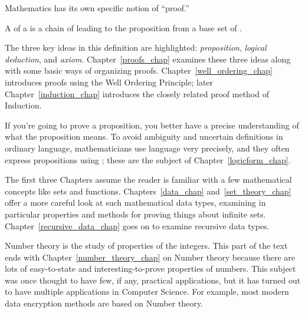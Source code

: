 Mathematics has its own specific notion of ``proof.''

\begin{definition*}
A  of a  is a chain of  leading to the proposition from a base set of .
\end{definition*}

The three key ideas in this definition are highlighted:
\emph{proposition}, \emph{logical deduction}, and \emph{axiom}.
Chapter~\ref{proofs_chap} examines these three ideas along with some
basic ways of organizing proofs.  Chapter~\ref{well_ordering_chap}
introduces proofs using the Well Ordering Principle; later
Chapter~\ref{induction_chap} introduces the closely related proof
method of Induction.

If you're going to prove a proposition, you better have a precise
understanding of what the proposition means.  To avoid ambiguity and
uncertain definitions in ordinary language, mathematicians use
language very precisely, and they often express propositions using
; these are the subject of
Chapter~\ref{logicform_chap}.

The first three Chapters assume the reader is familiar with a few
mathematical concepts like sets and functions.
Chapters~\ref{data_chap} and~\ref{set_theory_chap} offer a more
careful look at such mathematical data types, examining in particular
properties and methods for proving things about infinite sets.
Chapter~\ref{recursive_data_chap} goes on to examine recursive data
types.

Number theory is the study of properties of the integers.  This part
of the text ends with Chapter~\ref{number_theory_chap} on Number
theory because there are lots of easy-to-state and
interesting-to-prove properties of numbers.  This subject was once
thought to have few, if any, practical applications, but it has turned
out to have multiple applications in Computer Science.  For example,
most modern data encryption methods are based on Number theory.

\endinput
